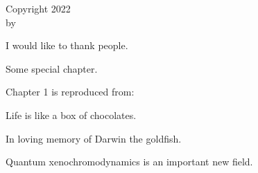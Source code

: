 

\ShowTitle

\begin{Copyright}
\large
Copyright 2022\\[\bigskipamount] by\\[\bigskipamount] \GetAuthors
\end{Copyright}

\begin{Acknowledgments}[no-entry]
I would like to thank people.
\end{Acknowledgments}




\begin{SpecialChapter}[title=Special chapter, no-entry]
Some special chapter.
\end{SpecialChapter}

\begin{Contributions}[no-entry]
Chapter 1 is reproduced from:\\[\smallskipamount]
\end{Contributions}

\begin{Epigraph}[no-entry]
\large Life is like a box of chocolates.\\
\hrulefill
\end{Epigraph}

\begin{Dedication}[no-entry]
In loving memory of Darwin the goldfish.
\end{Dedication}

\begin{Abstract}[no-entry]
\AbstractHeader
Quantum xenochromodynamics is an important new field.
\end{Abstract}

\ShowTableOfContents
\ShowListOfFigures
\ShowListOfTables
\ShowListOfAbbreviations
\ShowNomenclature
